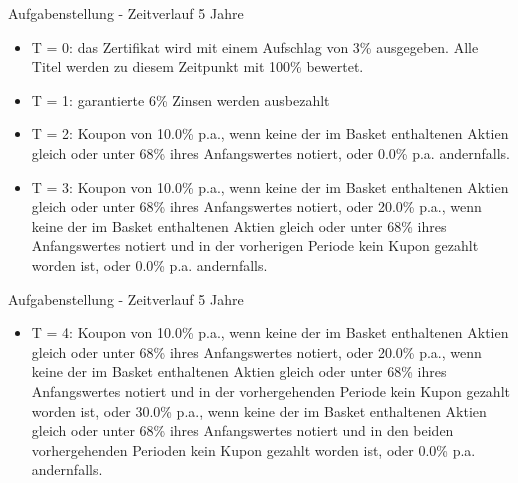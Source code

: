 \begin{frame}{Aufgabenstellung - Zeitverlauf 5 Jahre}
\begin{itemize}
	\item T = 0: das Zertifikat wird mit einem Aufschlag von 3\% ausgegeben. Alle Titel werden zu diesem Zeitpunkt mit 100\% bewertet.
	\item T = 1: garantierte 6\% Zinsen werden ausbezahlt
	\item T = 2: Koupon von 10.0\% p.a., wenn keine der im Basket enthaltenen Aktien gleich
oder unter 68\% ihres Anfangswertes notiert, oder 0.0\% p.a. andernfalls.
	\item T = 3: Koupon von 10.0\% p.a., wenn keine der im Basket enthaltenen Aktien gleich
oder unter 68\% ihres Anfangswertes notiert, oder 20.0\% p.a., wenn keine der im
Basket enthaltenen Aktien gleich oder unter 68\% ihres Anfangswertes notiert und
in der vorherigen Periode kein Kupon gezahlt worden ist, oder 0.0\% p.a. andernfalls.
\end{itemize}
\end{frame}

\begin{frame}{Aufgabenstellung - Zeitverlauf 5 Jahre}
\begin{itemize}
	\item T = 4: Koupon von 10.0\% p.a., wenn keine der im Basket enthaltenen Aktien gleich
oder unter 68\% ihres Anfangswertes notiert, oder 20.0\% p.a., wenn keine der im
Basket enthaltenen Aktien gleich oder unter 68\% ihres Anfangswertes notiert und
in der vorhergehenden Periode kein Kupon gezahlt worden ist, oder 30.0\% p.a., wenn
keine der im Basket enthaltenen Aktien gleich oder unter 68\% ihres Anfangswertes
notiert und in den beiden vorhergehenden Perioden kein Kupon gezahlt worden ist,
oder 0.0\% p.a. andernfalls.
\end{itemize}
\end{frame}


